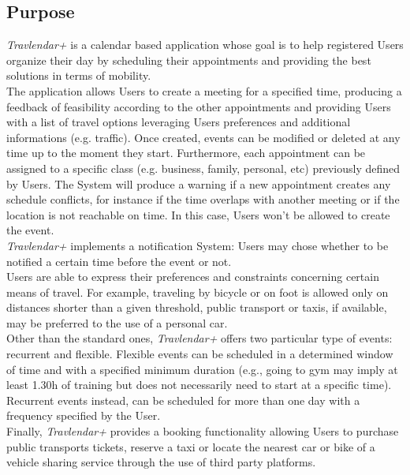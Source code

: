 \subsection{Purpose}

\textit{Travlendar+} is a calendar based application whose goal is to help registered Users organize their day by scheduling their appointments and providing the best solutions in terms of mobility.\\
The application allows Users to create a meeting for a specified time, producing a feedback of feasibility according to the other appointments and providing Users with a list of travel options leveraging Users preferences and additional informations (e.g. traffic). Once created, events can be modified or deleted at any time up to the moment they start. Furthermore, each appointment can be assigned to a specific class (e.g. business, family, personal, etc) previously defined by Users. 
The System will produce a warning if a new appointment creates any schedule conflicts, for instance if the time overlaps with another meeting or if the location is not reachable on time. In this case, Users won't be allowed to create the event.\\
\textit{Travlendar+} implements a notification System: Users may chose whether to be notified a certain time before the event or not.\\
Users are able to express their preferences and constraints concerning certain means of travel. For example, traveling by bicycle or on foot is allowed only on distances shorter than a given threshold, public transport or taxis, if available, may be preferred to the use of a personal car.\\
Other than the standard ones, \textit{Travlendar+} offers two particular type of events: recurrent and flexible. Flexible events can be scheduled in a determined window of time and with a specified minimum duration (e.g., going to gym may imply at least 1.30h of training but does not necessarily need to start at a specific time). Recurrent events instead, can be scheduled for more than one day with a frequency specified by the User.\\
Finally, \textit{Travlendar+} provides a booking functionality allowing Users to purchase public transports tickets, reserve a taxi or locate the nearest car or bike of a vehicle sharing service through the use of third party platforms.\\ 

